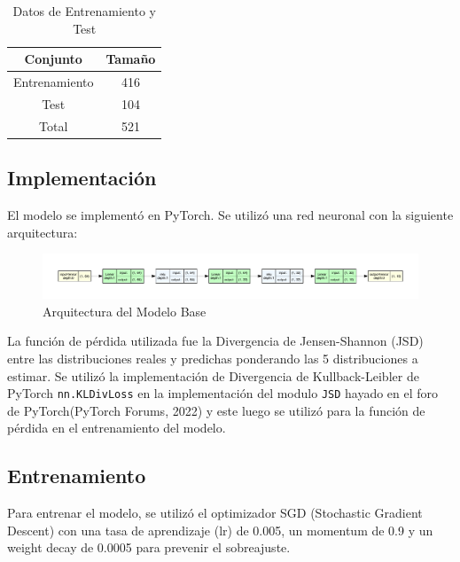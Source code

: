 \documentclass[
  a4paper,
]{article}
\begin{document}
\begin{table}
\caption{Datos de Entrenamiento y Test}
\begin{center}
\begin{tabular}{|c|c|}
\hline
\textbf{Conjunto} & \textbf{Tamaño} \\
\hline
Entrenamiento & 416 \\
Test & 104 \\
Total & 521 \\
\hline
\end{tabular}
\end{center}
\end{table}

\hypertarget{implementaciuxf3n-1}{%
\subsection{Implementación}\label{implementaciuxf3n-1}}

El modelo se implementó en PyTorch. Se utilizó una red neuronal con la
siguiente arquitectura:

\begin{figure}[H]
  \centering
  \includegraphics[width=\textwidth]{recursos_pdf/graficos/p2v_dist_model_H.pdf}
  \caption{Arquitectura del Modelo Base}
\end{figure}

La función de pérdida utilizada fue la Divergencia de Jensen-Shannon
(JSD) entre las distribuciones reales y predichas ponderando las 5
distribuciones a estimar. Se utilizó la implementación de Divergencia de
Kullback-Leibler de PyTorch \texttt{nn.KLDivLoss} en la implementación
del modulo \texttt{JSD} hayado en el foro de PyTorch(PyTorch Forums,
2022) y este luego se utilizó para la función de pérdida en el
entrenamiento del modelo.

\hypertarget{entrenamiento}{%
\subsection{Entrenamiento}\label{entrenamiento}}

Para entrenar el modelo, se utilizó el optimizador SGD (Stochastic
Gradient Descent) con una tasa de aprendizaje (lr) de 0.005, un momentum
de 0.9 y un weight decay de 0.0005 para prevenir el sobreajuste.
\end{document}
